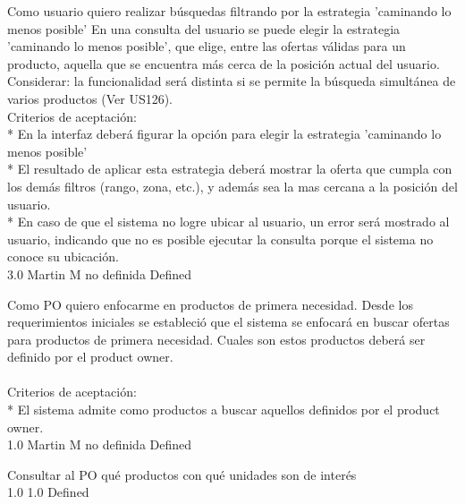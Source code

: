 	{Como usuario quiero realizar búsquedas filtrando por la estrategia 'caminando lo menos posible'} %
	{En una consulta del usuario se puede elegir la estrategia 'caminando lo menos
posible', que elige, entre las ofertas válidas para un producto, aquella que
se encuentra más cerca de la posición actual del usuario.
Considerar: la funcionalidad será distinta si se permite la búsqueda
simultánea de varios productos (Ver US126).
  \\
Criterios de aceptación:\\
* En la interfaz deberá figurar la opción para elegir la estrategia 'caminando lo menos posible'\\
* El resultado de aplicar esta estrategia deberá mostrar la oferta que cumpla con los demás filtros (rango, zona, etc.), y además sea la mas cercana a la posición del usuario.\\
* En caso de que el sistema no logre ubicar al usuario, un error será mostrado al usuario, indicando que no es posible ejecutar la consulta porque el sistema no conoce su ubicación.\\
} %
	{} %
	{3.0} %
	{Martin M} %
	{no definida} %
	{Defined} %


\vspace{20pt}

	{Como PO quiero enfocarme en productos de primera necesidad.} %
	{Desde los requerimientos iniciales se estableció que el sistema se enfocará en
buscar ofertas para productos de primera necesidad. Cuales son estos productos
deberá ser definido por el product owner.\\
  \\
Criterios de aceptación:\\
* El sistema admite como productos a buscar aquellos definidos por el product owner.\\
} %
	{} %
	{1.0} %
	{Martin M} %
	{no definida} %
	{Defined} %

		{Consultar al PO qué productos con qué unidades son de interés} %
		{\\
} %
		{1.0} %
		{} %
		{1.0} %
		{Defined} %

